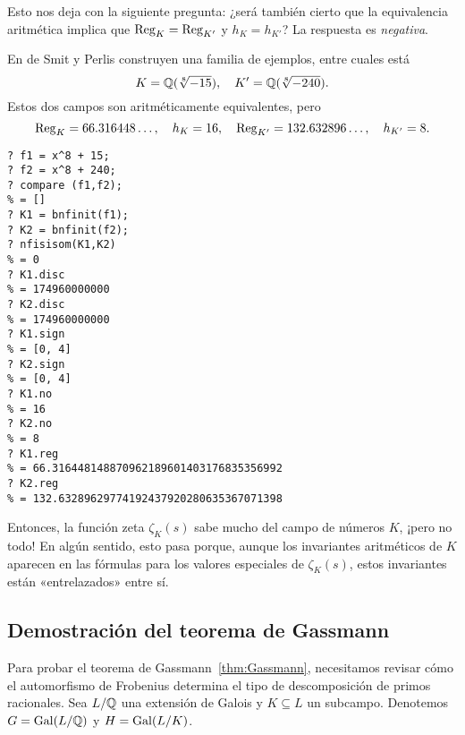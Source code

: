 Esto nos deja con la siguiente pregunta: ¿será también cierto que la
equivalencia aritmética implica que $\operatorname{Reg}_K = \operatorname{Reg}_{K'}$ y $h_K = h_{K'}$? La
respuesta es \emph{negativa}.

\begin{ejemplo}
  En \cite{deSmit-Perlis-1994} de Smit y Perlis
  construyen una familia de ejemplos, entre cuales está
  \[ K = \mathbb{Q} (\sqrt[8]{-15}), \quad K' = \mathbb{Q} (\sqrt[8]{-240}). \]
  Estos dos campos son aritméticamente equivalentes, pero
  \[ \operatorname{Reg}_K = 66.316448\ldots, \quad
    h_K = 16, \quad
    \operatorname{Reg}_{K'} = 132.632896\ldots, \quad
    h_{K'} = 8. \]

  \begin{shaded}\small
\begin{verbatim}
? f1 = x^8 + 15;
? f2 = x^8 + 240;
? compare (f1,f2);
% = []
? K1 = bnfinit(f1);
? K2 = bnfinit(f2);
? nfisisom(K1,K2)
% = 0
? K1.disc
% = 174960000000
? K2.disc
% = 174960000000
? K1.sign
% = [0, 4]
? K2.sign
% = [0, 4]
? K1.no
% = 16
? K2.no
% = 8
? K1.reg
% = 66.316448148870962189601403176835356992
? K2.reg
% = 132.63289629774192437920280635367071398
\end{verbatim}
  \end{shaded}
\end{ejemplo}

Entonces, la función zeta $\zeta_K (s)$ sabe mucho del campo de números $K$,
¡pero no todo! En algún sentido, esto pasa porque, aunque los invariantes
aritméticos de $K$ aparecen en las fórmulas para los valores especiales de
$\zeta_K (s)$, estos invariantes están «entrelazados» entre sí.

\subsection{Demostración del teorema de Gassmann}

Para probar el teorema de Gassmann~\ref{thm:Gassmann}, necesitamos revisar cómo
el automorfismo de Frobenius determina el tipo de descomposición de primos
racionales. Sea $L/\mathbb{Q}$ una extensión de Galois y $K \subseteq L$ un
subcampo. Denotemos $G = \operatorname{Gal} (L/\mathbb{Q})$ y $H = \operatorname{Gal} (L/K)$.


